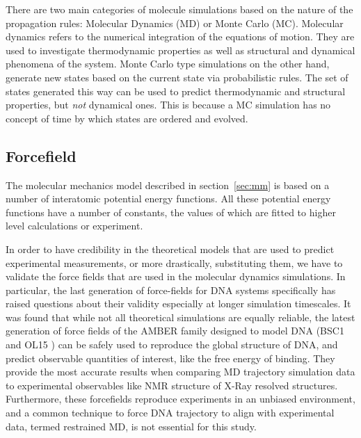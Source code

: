 \documentclass[11pt, a4paper]{report}
\begin{document}
There are two main categories of molecule simulations based on the nature of the propagation rules: Molecular Dynamics (MD) or Monte Carlo (MC). Molecular dynamics refers to the numerical integration of the equations of motion. They are used to investigate thermodynamic properties as well as structural and dynamical phenomena of the system. Monte Carlo type simulations on the other hand, generate new states based on the current state via probabilistic rules. The set of states generated this way can be used to predict thermodynamic and structural properties, but \emph{not} dynamical ones. This is because a MC simulation has no concept of time by which states are ordered and evolved.


\subsection{Forcefield}

The molecular mechanics model described in section~\ref{sec:mm} is based on a number of interatomic potential energy functions. All these potential energy functions have a number of constants, the values of which are fitted to higher level calculations or experiment.

In order to have credibility in the theoretical models that are used to predict experimental measurements, or more drastically, substituting them, we have to validate the force fields that are used in the molecular dynamics simulations. In particular, the last generation of force-fields for DNA systems specifically has raised questions about their validity especially at longer simulation timescales. It was found that while not all theoretical simulations are equally reliable, the latest generation of force fields of the AMBER family designed to model DNA (BSC1 \cite{ivani2016parmbsc1} and OL15 \cite{zgarbova2015refinement}) can be safely used to reproduce the global structure of DNA, and predict observable quantities of interest, like the free energy of binding. They provide the most accurate results when comparing MD trajectory simulation data to experimental observables like NMR structure of X-Ray resolved structures. Furthermore, these forcefields reproduce experiments in an unbiased environment, and a common technique to force DNA trajectory to align with experimental data, termed restrained MD, is not essential for this study.
\end{document}
